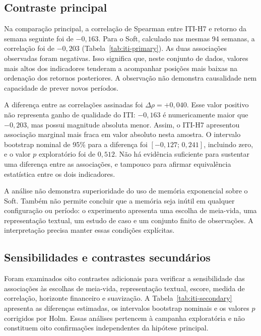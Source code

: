 \subsection{Contraste principal}
\label{subsec:campanha-iti}

Na comparação principal, a correlação de Spearman entre ITI-H7 e retorno da semana seguinte foi de $-0{,}163$. Para o Soft, calculado nas mesmas 94 semanas, a correlação foi de $-0{,}203$ (Tabela~\ref{tab:iti-primary}). As duas associações observadas foram negativas. Isso significa que, neste conjunto de dados, valores mais altos dos indicadores tenderam a acompanhar posições mais baixas na ordenação dos retornos posteriores. A observação não demonstra causalidade nem capacidade de prever novos períodos.



A diferença entre as correlações assinadas foi $\Delta\rho=+0{,}040$. Esse valor positivo não representa ganho de qualidade do ITI: $-0{,}163$ é numericamente maior que $-0{,}203$, mas possui magnitude absoluta menor. Assim, o ITI-H7 apresentou associação marginal mais fraca em valor absoluto nesta amostra. O intervalo bootstrap nominal de 95\% para a diferença foi $[-0{,}127;\,0{,}241]$, incluindo zero, e o valor $p$ exploratório foi de $0{,}512$. Não há evidência suficiente para sustentar uma diferença entre as associações, e tampouco para afirmar equivalência estatística entre os dois indicadores.

A análise não demonstra superioridade do uso de memória exponencial sobre o Soft. Também não permite concluir que a memória seja inútil em qualquer configuração ou período: o experimento apresenta uma escolha de meia-vida, uma representação textual, um estudo de caso e um conjunto finito de observações. A interpretação precisa manter essas condições explícitas.

\subsection{Sensibilidades e contrastes secundários}

Foram examinados oito contrastes adicionais para verificar a sensibilidade das associações às escolhas de meia-vida, representação textual, escore, medida de correlação, horizonte financeiro e suavização. A Tabela~\ref{tab:iti-secondary} apresenta as diferenças estimadas, os intervalos bootstrap nominais e os valores $p$ corrigidos por Holm. Essas análises pertencem à campanha exploratória e não constituem oito confirmações independentes da hipótese principal.

